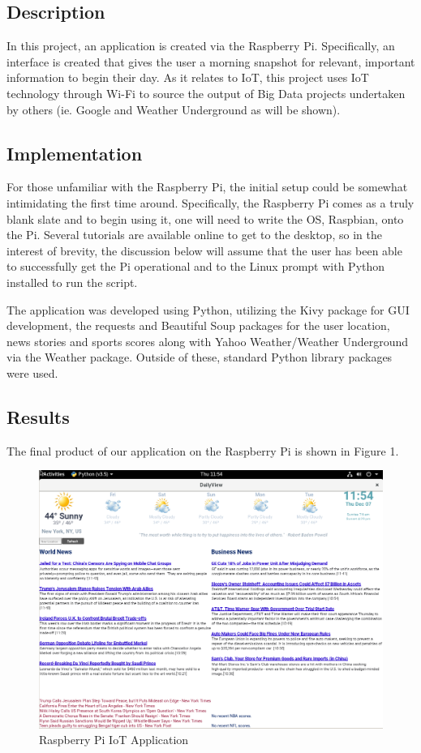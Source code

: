 \documentclass[sigconf]{acmart}
\begin{document}
\subsection{Description}
In this project, an application is created via the Raspberry Pi. Specifically, an interface is created that gives the user a morning snapshot for relevant, important information to begin their day. As it relates to IoT, this project uses IoT technology through Wi-Fi to source the output of Big Data projects undertaken by others (ie. Google and Weather Underground as will be shown).
\subsection{Implementation}
For those unfamiliar with the Raspberry Pi, the initial setup could be somewhat intimidating the first time around. Specifically, the Raspberry Pi comes as a truly blank slate and to begin using it, one will need to write the OS, Raspbian, onto the Pi. Several tutorials are available online to get to the desktop, so in the interest of brevity, the discussion below will assume that the user has been able to successfully get the Pi operational and to the Linux prompt with Python installed to run the script.

The application was developed using Python, utilizing the Kivy package for GUI development, the requests and Beautiful Soup packages for the user location, news stories and sports scores along with Yahoo Weather/Weather Underground via the Weather package. Outside of these, standard Python library packages were used. 

\subsection{Results}
The final product of our application on the Raspberry Pi is shown in Figure 1. 

\begin{figure}[!ht]
  \centering\includegraphics[width=\columnwidth]{images/monitor.png}
  \caption{Raspberry Pi IoT Application}
  \label{f:Figure1}
\end{figure}
\end{document}
